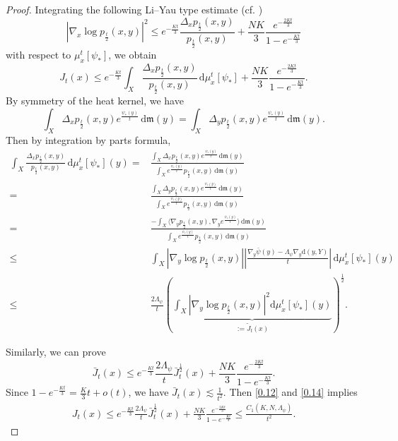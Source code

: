 \documentclass[a4paper,11pt]{article}
\numberwithin{equation}{section}
\theoremstyle{plain}
\theoremstyle{definition}
\theoremstyle{remark}
\newcommand{\mm}{\mathfrak m}
\renewcommand{\d}{{\mathrm d}}
\begin{document}
	\begin{proof}
	Integrating the following Li--Yau type estimate  (cf. \cite[Theorem 1.2]{zbMATH06441788})
		\begin{equation}\label{Li-Yau}
			|\nabla_x \log p_\frac{t}{2}(x,y)|^2\leq e^{-\frac{Kt}{3}}\frac{\Delta_x p_\frac{t}{2}(x,y)}{p_\frac{t}{2}(x,y)}+\frac{NK}{3}\frac{e^{-\frac{2Kt}{3}}}{1-e^{-\frac{Kt}{3}}}
		\end{equation}
with respect to $\mu_x^t[\psi_*]$, we obtain
		\begin{equation}\label{0.12}
			J_t(x)\leq e^{-\frac{Kt}{3}}\int_{X} \frac{\Delta_x p_\frac{t}{2}(x,y)}{p_\frac{t}{2}(x,y)}\,\d \mu_x^t[\psi_*]+\frac{NK}{3}\frac{e^{-\frac{2Kt}{3}}}{1-e^{-\frac{Kt}{3}}}.
		\end{equation}
		 By symmetry of the heat kernel,    we have $$\int_{X} \Delta_x p_\frac{t}{2}(x,y) e^{\frac{\psi_*(y)}{t}}\,\d\mm(y)=\int_{X} \Delta_y p_\frac{t}{2}(x,y) e^{\frac{\psi_*(y)}{t}}\,\d\mm(y).$$ Then by integration by parts formula,
		\begin{equation}\label{0.14}
			\begin{aligned}
				\int_{X} \frac{\Delta_x p_\frac{t}{2}(x,y)}{p_\frac{t}{2}(x,y)}\,\d \mu_x^t[\psi_*](y)=&\frac{\int_{X} \Delta_x p_\frac{t}{2}(x,y) e^{\frac{\psi_*(y)}{t}}\,\d\mm(y)}{\int_{X} e^{\frac{\psi_*(y)}{t}} p_\frac{t}{2}(x,y)\,\d\mm(y)}\\
				=&\frac{\int_{X} \Delta_y p_\frac{t}{2}(x,y) e^{\frac{\psi_*(y)}{t}}\,\d\mm(y)}{\int_{X} e^{\frac{\psi_*(y)}{t}} p_\frac{t}{2}(x,y)\,\d\mm(y)}\\
				=&\frac{-\int_{X} \langle\nabla_y p_\frac{t}{2}(x,y), \nabla_y e^{\frac{\psi_*(y)}{t}}\rangle \,\d\mm(y)}{\int_{X} e^{\frac{\psi_*(y)}{t}} p_\frac{t}{2}(x,y)\,\d\mm(y)}\\
				\leq&\int_{X} |\nabla_y \log p_\frac{t}{2}(x,y)| \left| \frac{\nabla_y\bar \psi(y)-\Lambda_\psi\nabla_y  \d(y,Y)}{t}\right|\,\d\mu_x^t[\psi_*](y)\\
				\leq&\frac{2\Lambda_\psi}{t} \left( \underbrace{\int_X |\nabla_y \log p_\frac{t}{2}(x,y)|^2 \d \mu_x^t[\psi_*](y)}_{:=\tilde{J}_t(x)} \right)^\frac 12.
			\end{aligned}
		\end{equation}
	
		
	
		Similarly, we can  prove
		\begin{equation}\label{2.26}
		\bar{J}_t(x)
		\leq e^{-\frac{Kt}{3}}\frac{2\Lambda_\psi}{t}\bar{J}_t^\frac{1}{2}(x)+\frac{NK}{3}\frac{e^{-\frac{2Kt}{3}}}{1-e^{-\frac{Kt}{3}}}.
		\end{equation}
Since $1-e^{-\frac{Kt}{3}}=\frac{K}{3}t+o(t)$,  we have
			$\bar{J}_t(x)\lesssim \frac{1}{t^2}$. Then  \eqref{0.12} and \eqref{0.14} implies
		\begin{equation}
			\begin{aligned}
				J_t(x)\leq e^{-\frac{Kt}{3}}\frac{2\Lambda_\psi}{t}\bar{J}_t^\frac{1}{2}(x)+\frac{NK}{3}\frac{e^{-\frac{2Kt}{3}}}{1-e^{-\frac{Kt}{3}}}\leq \frac{C_1(K,N, \Lambda_\psi)}{t^2}.
			\end{aligned}
		\end{equation}

\end{proof}
	
\end{document}
